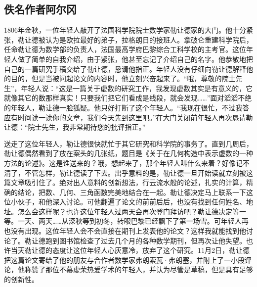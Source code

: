 \documentclass[b5paper]{ctexart}
\begin{document}
\subsection{佚名作者阿尔冈}
1806年金秋，一位年轻人敲开了法国科学院院士数学家勒让德家的大门。他十分紧张，勒让德被认为是欧拉最好的弟子，拉格朗日的接班人。拿破仑重建科学院后，任命勒让德为数学部的负责人，法国最高学府巴黎综合工科学校的主考官。这位年轻人做了简单的自我介绍，由于紧张，他甚至忘记了介绍自己的名字。他恭敬地把自己的一篇研究手稿交给了勒让德，恳请他指正。年轻人没有仔细向勒让德解释他的目的，但是当被问起论文的内容时，他立刻兴奋起来了。“哦，尊敬的院士先生”，年轻人说：“这是一篇关于虚数的研究工作，我发现虚数其实是有意义的，它就像其它的数那样真实！只要我们把它们看成是线段，就会发现……”面对滔滔不绝的年轻人，勒让德一脸狐疑。他只好打断了这个年轻人。“我现在很忙，不过我答应有时间读一读你的文章，我们今天先到这里吧。”在大门关闭前年轻人再次恳请勒让德：“院士先生，我非常期待您的批评指正。”

送走了这位年轻人，勒让德很快就忙于其它研究和科学院的事务了。直到几周后，勒让德偶然看到了放在案头的几张纸，题目是《关于在几何构造中表示虚数的一种方法的论述》。这是谁送来的？哦，想起来了，那个年轻人叫什么来着？好像记不清了，不管怎样，勒让德读了下去。出乎意料的是，勒让德一旦开始读就立刻被这篇文章吸引住了。绝对出人意料的创新想法，行云流水般的论述，扎实的计算，精确的结论，把数、几何、三角函数完美地结合在一起。勒让德决定马上联系一下这位小伙子，和他深入讨论。可他翻遍了论文的前前后后，也没有找到任何姓名、地址。怎么会这样呢？也许这位年轻人过两天会再次登门拜访吧？勒让德决定等一等。一天、两天……从深秋等到初冬，转眼巴黎已经飘下了第一场雪。可年轻人再也没有出现。这位年轻人会不会直接在期刊上发表他的论文？这样我就能找到他讨论了。勒让德跑到图书馆检查了过去几个月的各种数学期刊，但再次让他失望。也许当天勒让德的态度让这位年轻人心灰意冷，放弃了这个研究。11月2日，勒让德把这篇论文寄给了他的朋友与合作者数学家弗朗索瓦·弗朗塞，并附上了一小段评论，他称赞了那位不慕虚荣热爱学术的年轻人，并认为尽管是草稿，但是具有足够的创新性。
\end{document}
